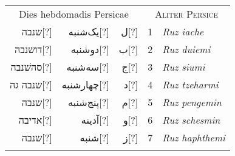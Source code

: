 %
\normalsize
\centering
\begin{tabular}{@{} r r r  r l @{}}
\multicolumn{3}{c}{Dies hebdomadis Persicae} &
\multicolumn{2}{c}{\textsc{Aliter Persice}}
\\
\cmidrule(lr){1-3} \cmidrule(lr){4-5}
\texthebrew{ שנבה}[?] %
& \textarabic{یک‌شنبه}[?] %
& \textarabic{ل}[?]
& 1
& \textit{Ruz iache}
\\
\texthebrew{דושנבה}[?] %
& \textarabic{دوشنبه}[?]
& \textarabic{ب}[?]
& 2
& \textit{Ruz duiemi}
\\
\texthebrew{סהשׁנבה‎}[?] %
& \textarabic{سه‌شنبه}[?]
& \textarabic{ج}[?]
& 3
& \textit{Ruz siumi}
\\
\texthebrew{גה‎ שנבה}[?] %
& \textarabic{چهارشنبه}[?]
& \textarabic{ﺩ}[?]
& 4
& \textit{Ruz tzeharmi}
\\
\texthebrew{שנבה}[?] %
& \textarabic{پنج‌شنبه}[?]
& \textarabic{م}[?]
& 5
& \textit{Ruz pengemin}
\\
\texthebrew{אדיבה}[?] %
& \textarabic{آدینه}[?]
& \textarabic{و}[?]
& 6
& \textit{Ruz schesmin}
\\
\texthebrew{שנבה}[?] %
& \textarabic{شنبه}[?]
& \textarabic{ز}[?]
& 7
& \textit{Ruz haphthemi}
\\
\addlinespace
\addlinespace
\end{tabular}



